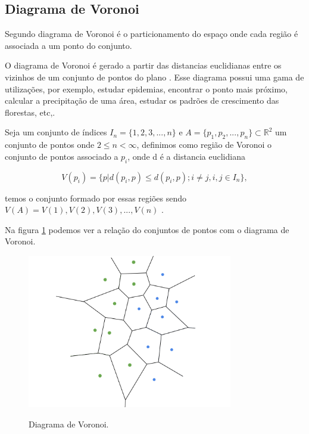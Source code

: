 \subsection{Diagrama de Voronoi}

Segundo  diagrama de Voronoi é o particionamento do espaço onde cada região é associada a um ponto do conjunto.

O diagrama de Voronoi é gerado a partir das distancias euclidianas entre os vizinhos de um conjunto de pontos do plano\space
\cite{diagrama_de_voronoi:_uma_exploracao_nas_distancias_euclidiana_e_do_taxi}. Esse diagrama possui uma gama de utilizações, por exemplo, estudar epidemias, encontrar o 
ponto mais próximo, calcular a precipitação de uma área, estudar os padrões de crescimento das florestas, etc,\space\cite{poligonos_de_thiessen_ou_voronoi}. 

Seja um conjunto de índices $I_n = \{1, 2, 3, ..., n\}$ e $A = \{p_1, p_2, ..., p_n\} \subset \mathbb{R}^2$ um conjunto de pontos onde $2 \leq n < \infty$, definimos como região de Voronoi o conjunto de pontos associado a $p_i$, onde d é a distancia euclidiana

\begin{equation}
	V(p_i) = \{p|d(p_i,p) \leq d(p_i,p);i \neq j, i, j \in I_n\},
\end{equation}


temos o conjunto formado por essas regiões sendo $V(A) = {V(1), V(2), V(3), ..., V(n)}$ \cite{rodrigues_diagrama_2019}.

Na figura \cref{fig:diagrama_voronoi} podemos ver a relação do conjuntos de pontos com o diagrama de Voronoi.

\begin{figure}[H]
	\centering
	\caption{Diagrama de Voronoi.}
	\includegraphics[width=0.8\textwidth]{figures/diagrama_de_voronoi.png}
	\label{fig:diagrama_voronoi}
\end{figure}

